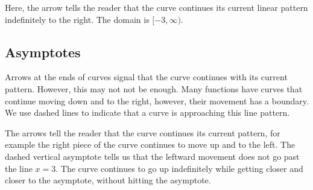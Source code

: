 \documentclass{ximera}
\begin{document}
Here, the arrow tells the reader that the curve continues its current linear pattern indefinitely to the right.  The domain is $[-3, \infty)$.











\subsection*{Asymptotes}


Arrows at the ends of curves signal that the curve continues with its current pattern. However, this may not not be enough.  Many functions have curves that continue moving down and to the right, however, their movement has a boundary. We use dashed lines to indicate that a curve is approaching this line pattern.


\begin{image}
\end{image}


The arrows tell the reader that the curve continues its current pattern, for example the right piece of the curve continues to move up and to the left.  The dashed vertical asymptote tells us that the leftward movement does not go past the line $x=3$.  The curve continues to go up indefinitely while getting closer and closer to the asymptote, without hitting the asymptote. 
\end{document}
